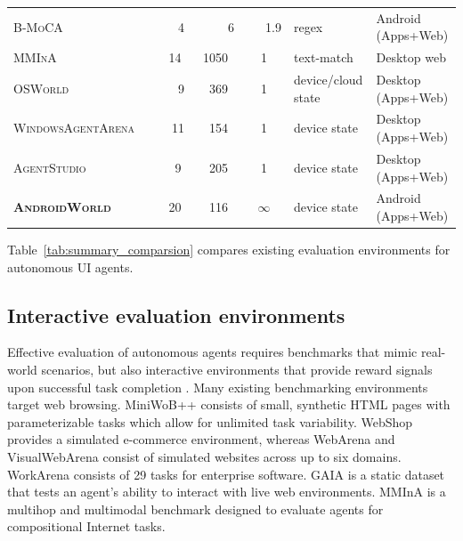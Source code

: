 \documentclass{article}
\newcommand{\system}{\textsc{AndroidWorld}\xspace}
\newcommand{\ntasks}{116\xspace}
\newcommand{\napps}{20\xspace}
\newcommand{\cmark}{\textcolor{green}{\ding{51}}} %
\begin{document}
\begin{table}[t]
{\begin{tabular}{@{}lccccll@{}}
\textsc{B-MoCA} & \cmark & ~~~4    & ~~~~~6 & ~~~1.9 & regex & Android (Apps+Web) \\
\textsc{MMInA} & \cmark & ~14 & 1050 & 1 & text-match & Desktop web \\
\textsc{OSWorld} & \cmark & ~~~9 & ~369 & 1 & device/cloud state & Desktop (Apps+Web) \\
\textsc{WindowsAgentArena} & \cmark & ~~11 & ~154 & 1 & device state & Desktop (Apps+Web) \\
\textsc{AgentStudio} & \cmark & ~~9 & ~205 & 1 & device state & Desktop (Apps+Web) \\
\midrule
\textbf{\system} & \cmark & ~\napps & ~\ntasks & $\infty$ & device state & Android (Apps+Web) \\
\bottomrule
\end{tabular}%
}
\end{table}

Table~\ref{tab:summary_comparsion} compares existing evaluation environments for autonomous UI agents. 

\subsection{Interactive evaluation environments}

Effective evaluation of autonomous agents requires benchmarks that mimic real-world scenarios, but also interactive environments that provide reward signals upon successful task completion \citep{rawles2023android, deng2023mind2web, abramson2022evaluating, Ruan2023-gu-toolemu, Chen2021-xc}. Many existing benchmarking environments target web browsing. MiniWoB++ \citep{miniwob, liu2018} consists of small, synthetic HTML pages with parameterizable tasks which allow for unlimited task variability.
WebShop \citep{yao2023webshop} provides a simulated e-commerce environment, whereas WebArena \citep{zhou2023webarena} and VisualWebArena \citep{koh2024visualwebarena} consist of simulated websites across up to six domains. WorkArena \citep{drouin2024workarena} consists of 29 tasks for enterprise software.  GAIA \citep{Mialon2023-ut} is a static dataset that tests an agent's ability to interact with live web environments. MMInA \citep{zhang2024mmina} is a multihop and multimodal benchmark designed to evaluate agents for compositional Internet tasks.
\end{document}
